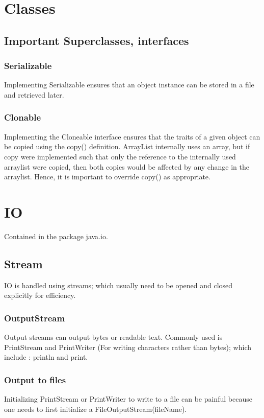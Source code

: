 \documentclass[oneside, article]{memoir}
\begin{document}
\section{Classes}
\subsection{Important Superclasses, interfaces}
\subsubsection{Serializable}
Implementing Serializable ensures that an object instance can be stored in a file and retrieved later.

\subsubsection{Clonable}
Implementing the Cloneable interface ensures that the traits of a given object can be copied using the copy() definition. ArrayList internally uses an array, but if copy were implemented such that only the reference to the internally used arraylist were copied, then both copies would be affected by any change in the arraylist. Hence, it is important to override copy() as appropriate.

\section{IO}
Contained in the package java.io.

\subsection{Stream}
IO is handled using streams; which usually need to be opened and closed explicitly for efficiency.

\subsubsection{OutputStream}
Output streams can output bytes or readable text. Commonly used is PrintStream and PrintWriter (For writing characters rather than bytes); which include : println and print.

\subsubsection{Output to files}
Initializing PrintStream or PrintWriter to write to a file can be painful because one needs to first initialize a FileOutputStream(fileName).
\end{document}
